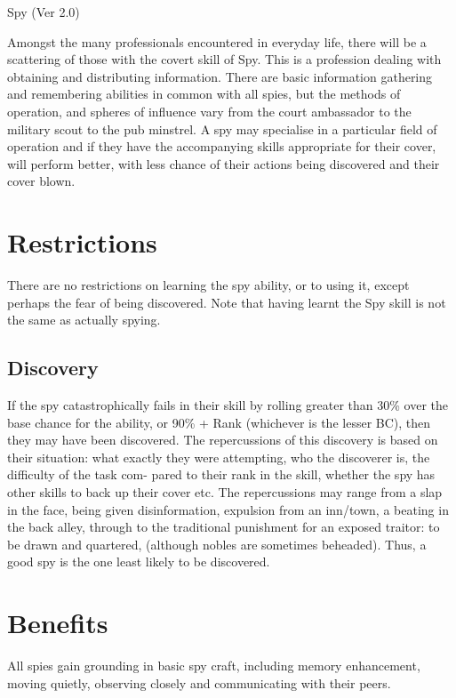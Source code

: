 \begin{Chapter}{Spy (Ver 2.0)}

Amongst the many professionals encountered in everyday life, there
will be a scattering of those with the covert skill of Spy.  This is a
profession dealing with obtaining and distributing information.
There are basic information gathering and remembering abilities in
common with all spies, but the methods of operation, and spheres of
influence vary from the court ambassador to the military scout to
the pub minstrel. A spy may specialise in a particular field of
operation and if they have the accompanying skills appropriate for
their cover, will perform better, with less chance of their actions
being discovered and their cover blown.

\section{Restrictions}

There are no restrictions on learning the spy ability, or to using it,
except perhaps the fear of being discovered.  Note that having learnt
the Spy skill is not the same as actually spying.

\subsection{Discovery}

If the spy catastrophically fails in their skill by rolling greater
than 30\% over the base chance for the ability, or 90\% + Rank
(whichever is the lesser BC), then they may have been discovered.  The
repercussions of this discovery is based on their situation: what
exactly they were attempting, who the discoverer is, the difficulty of
the task com- pared to their rank in the skill, whether the spy has
other skills to back up their cover etc.  The repercussions may range
from a slap in the face, being given disinformation, expulsion from an
inn/town, a beating in the back alley, through to the traditional
punishment for an exposed traitor: to be drawn and quartered,
(although nobles are sometimes beheaded). Thus, a good spy is the one
least likely to be discovered.

\section{Benefits}

All spies gain grounding in basic spy craft, including memory
enhancement, moving quietly, observing closely and communicating with
their peers.


\end{Chapter}
